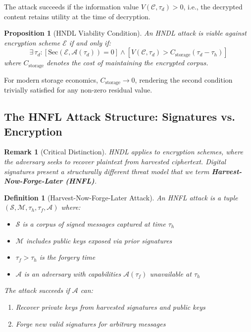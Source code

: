 \documentclass[11pt,a4paper]{article}
\newtheorem{proposition}[theorem]{Proposition}
\newtheorem{definition}[theorem]{Definition}
\newtheorem{remark}[theorem]{Remark}
\begin{document}
The attack succeeds if the information value $V(\mathcal{C}, \tau_d) > 0$, i.e., the decrypted content retains utility at the time of decryption.

\begin{proposition}[HNDL Viability Condition]
An HNDL attack is viable against encryption scheme $\mathcal{E}$ if and only if:
\begin{equation}
\exists\, \tau_d : \left[\text{Sec}(\mathcal{E}, \mathcal{A}(\tau_d)) = 0\right] \land \left[V(\mathcal{C}, \tau_d) > C_{\text{storage}}(\tau_d - \tau_h)\right]
\end{equation}
where $C_{\text{storage}}$ denotes the cost of maintaining the encrypted corpus.
\end{proposition}

For modern storage economics, $C_{\text{storage}} \to 0$, rendering the second condition trivially satisfied for any non-zero residual value.

\subsection{The HNFL Attack Structure: Signatures vs. Encryption}

\begin{remark}[Critical Distinction]
HNDL applies to \textit{encryption schemes}, where the adversary seeks to recover plaintext from harvested ciphertext. Digital signatures present a structurally different threat model that we term \textbf{Harvest-Now-Forge-Later (HNFL)}.
\end{remark}

\begin{definition}[Harvest-Now-Forge-Later Attack]
An HNFL attack is a tuple $(\mathcal{S}, \mathcal{M}, \tau_h, \tau_f, \mathcal{A})$ where:
\begin{itemize}[noitemsep]
    \item $\mathcal{S}$ is a corpus of signed messages captured at time $\tau_h$
    \item $\mathcal{M}$ includes public keys exposed via prior signatures
    \item $\tau_f > \tau_h$ is the forgery time
    \item $\mathcal{A}$ is an adversary with capabilities $\mathcal{A}(\tau_f)$ unavailable at $\tau_h$
\end{itemize}
The attack succeeds if $\mathcal{A}$ can:
\begin{enumerate}[noitemsep]
    \item Recover private keys from harvested signatures and public keys
    \item Forge new valid signatures for arbitrary messages
\end{enumerate}
\end{definition}
\end{document}

